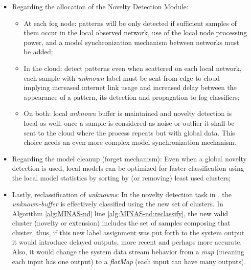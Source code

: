 \begin{itemize}
  \item Regarding the allocation of the Novelty Detection Module:
  \begin{itemize}
    
    \item At each fog node: patterns will be only detected if sufficient samples
    of them occur in the local observed network, use of the local node
    processing power, and a model synchronization mechanism between networks
    must be added;

    \item In the cloud: detect patterns even when scattered on each local
    network, each sample with \emph{unknown} label must be sent from edge to
    cloud implying increased internet link usage and increased delay between the
    appearance of a pattern, its detection and propagation to fog classifiers;

    \item On both: local \emph{unknown} buffer is maintained and novelty
    detection is local as well, once a sample is considered as noise or outlier
    it shall be sent to the cloud where the process repeats but with global
    data.
    This choice needs an even more complex model synchronization mechanism.

  \end{itemize}
    
  \item Regarding the model cleanup (forget mechanism): Even when a global
  novelty detection is used, local models can be optimized for faster
  classification using the local model statistics by sorting by (or removing)
  least used clusters;

  \item Lastly, reclassification of \emph{unknowns}: In the novelty detection
  task in \minas, the \emph{unknown-buffer} is effectively classified
  using the new set of clusters.
  In Algorithm \ref{alg:MINAS-nd} line \ref{alg:MINAS-nd:reclassify}, the
  new valid cluster (novelty or extension) includes the set of samples composing
  that cluster, thus, if this new label assignment was put forth to the system
  output it would introduce delayed outputs, more recent and perhaps more
  accurate.
  Also, it would change the system data stream behavior from a \emph{map}
  (meaning each input has one output) to a \emph{flatMap} (each input can have
  many outputs).

\end{itemize}

